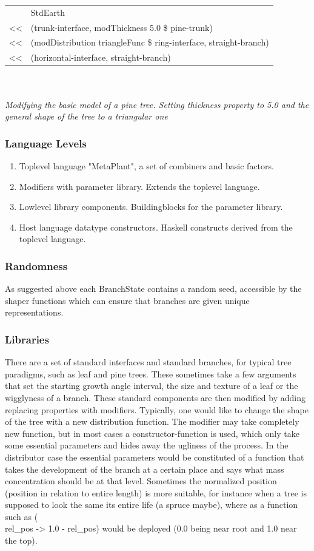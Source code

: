 \begin{tabular}{ll}
  &StdEarth\\
  <<&(trunk-interface, modThickness 5.0 \$ pine-trunk)\\
  <<&(modDistribution triangleFunc \$ ring-interface, straight-branch)\\
  <<&(horizontal-interface, straight-branch)\\ 
\end{tabular}
\\\\
\emph{Modifying the basic model of a pine tree. Setting thickness property to
5.0 and the general shape of the tree to a triangular one}

\subsubsection{Language Levels}
\begin{enumerate}
\item
Toplevel language "MetaPlant", a set of combiners and basic factors.
\item
Modifiers with parameter library. Extends the toplevel language.
\item
Lowlevel library components. Buildingblocks for the parameter library.
\item
Host language datatype constructors. Haskell constructs derived from the
toplevel language.
\end{enumerate}

\subsubsection{Randomness}
As suggested above each BranchState contains a random seed, accessible by the
shaper functions which can ensure that branches are given unique
representations.

\subsubsection{Libraries}
There are a set of standard interfaces and standard branches, for typical tree
paradigms, such as leaf and pine trees. These sometimes take a few arguments 
that set the starting growth angle interval, the size and texture of a leaf or
the wigglyness of a branch. These standard components are then modified by
adding replacing properties with modifiers. Typically, one would like to change
the shape of the tree with a new distribution function. The modifier may take
completely new function, but in most cases a constructor-function is used, which only
take some essential parameters and hides away the ugliness of the process. In
the distributor case the essential parameters would be constituted of a function
that takes the development of the branch at a certain place and says what mass concentration should
be at that level. Sometimes the normalized position (position in relation to
entire length) is more suitable, for instance when a tree is supposed to look
the same its entire life (a spruce maybe), where as a function such as (\\rel\_pos
-> 1.0 - rel\_pos) would be deployed (0.0 being near root and 1.0 near the top).

